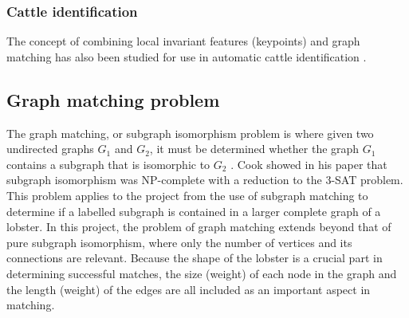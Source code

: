 \subsubsection{Cattle identification}
The concept of combining local invariant features (keypoints) and graph matching has also been studied for use in automatic cattle identification \cite{cattle}. 

\subsection{Graph matching problem}
The graph matching, or subgraph isomorphism problem is where given two undirected graphs $G_1$ and $G_2$, it must be determined whether the graph $G_1$ contains a subgraph that is isomorphic to $G_2$ \cite{subgraph}. Cook showed in his paper that subgraph isomorphism was NP-complete with a reduction to the 3-SAT problem. 
\n
This problem applies to the project from the use of subgraph matching to determine if a labelled subgraph is contained in a larger complete graph of a lobster. 
\n
In this project, the problem of graph matching extends beyond that of pure subgraph isomorphism, where only the number of vertices and its connections are relevant. Because the shape of the lobster is a crucial part in determining successful matches, the size (weight) of each node in the graph and the length (weight) of the edges are all included as an important aspect in matching. 